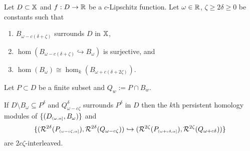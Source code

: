 \begin{theorem}
  Let $D\subset\mathbb{X}$ and $f : D\to\mathbb{R}$ be a $c$-Lipschitz function.
  Let $\omega\in\mathbb{R}$, $\zeta\geq 2\delta\geq 0$ be constants such that
  \begin{enumerate}[label=\Roman*.]
    \item $B_{\omega-c(\delta+\zeta)}$ surrounds $D$ in $\mathbb{X}$,
    \item $\hom(B_{\omega-c(\delta+\zeta)}\hookrightarrow B_\omega)$ is surjective, and
    \item $\hom(B_\omega)\cong\hom_k(B_{\omega+c(\delta+2\zeta)})$.
  \end{enumerate}
  Let $P\subset D$ be a finite subset and $Q_w := P\cap B_w$.

  If $D\setminus B_\omega\subseteq P^\delta$ and $Q_{\omega-c\zeta}^\delta$ surrounds $P^\delta$ in $D$ then the $k$th persistent homology modules of $\{(D_{\scriptscriptstyle (\omega,\alpha]}, B_\omega)\}$ and
  \[
    \{(\mathcal{R}^{2\delta}(P_{\scriptscriptstyle (\omega-c\zeta,\alpha]}), \mathcal{R}^{2\delta}(Q_{\omega-c\zeta})) \hookrightarrow
      (\mathcal{R}^{2\zeta}(P_{\scriptscriptstyle (\omega+c\delta,\alpha]}), \mathcal{R}^{2\zeta}(Q_{\omega+c\delta}))\}
  \]
  are $2c\zeta$-interleaved.
\end{theorem}
